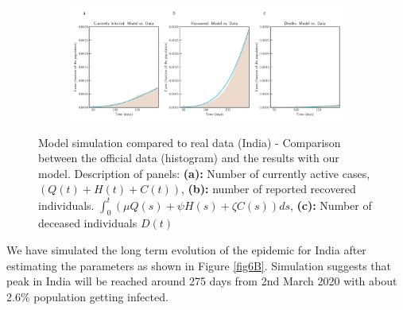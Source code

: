 \documentclass[authoryear,preprint]{elsarticle}
\begin{document}
\begin{figure}[t!]
	\centering
	\begin{subfigure}[b]{\textwidth}
		\centering
		\includegraphics[width=1\linewidth]{India_plot_model_data.pdf}
	\end{subfigure}
	\caption{Model simulation compared to real data (India) - Comparison between the official data (histogram) and the results with our model. Description of panels: \textbf{(a):} Number of currently active cases, $\left( Q(t) + H(t) + C(t)\right)$, \textbf{(b):} number of reported recovered individuals. $\int_{0}^{t}{\left( \mu Q(s) + \psi H(s) + \zeta  C(s) \right) ds}$, \textbf{(c):} Number of deceased individuals $D(t)$}
	\label{fig6A} 
\end{figure}

We have simulated the long term evolution of the epidemic for India after estimating the parameters as shown in Figure \ref{fig6B}. Simulation suggests that peak in India will be reached around 275 days from 2nd March 2020 with about 2.6\% population getting infected. 
\end{document}
